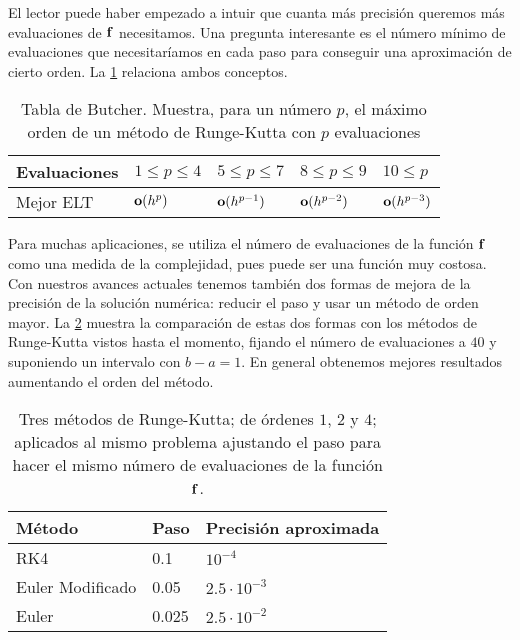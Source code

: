El lector puede haber empezado a intuir que cuanta más precisión queremos
más evaluaciones de $\vb{f}$ necesitamos.
Una pregunta interesante es
el número mínimo de evaluaciones que necesitaríamos en cada paso
para conseguir una aproximación de cierto orden.
La \cref{tab:butcher} relaciona ambos conceptos.

\begin{table}[H]
    \centering
    \begin{tabular}{|l||l|l|l|l|}
        \hline
        Evaluaciones & $1\le p\le 4$ & $5\le p\le 7$ & $8\le p\le 9$
            & $10\le p$ \\
        \hline
        Mejor ELT & $\vb{o}(h^p)$ & $\vb{o}(h^{p-1})$ & $\vb{o}(h^{p-2})$
            & $\vb{o}(h^{p-3})$ \\
        \hline
    \end{tabular}
    \caption{Tabla de Butcher.
        Muestra, para un número $p$,
        el máximo orden de un método de Runge-Kutta con $p$ evaluaciones}
    \label{tab:butcher}
\end{table}

Para muchas aplicaciones,
se utiliza el número de evaluaciones de la función $\vb{f}$
como una medida de la complejidad,
pues puede ser una función muy costosa.
Con nuestros avances actuales tenemos también dos formas de mejora
de la precisión de la solución numérica:
reducir el paso
y usar un método de orden mayor.
La \cref{tab:order-vs-step} muestra la comparación de estas dos formas
con los métodos de Runge-Kutta vistos hasta el momento,
fijando el número de evaluaciones a $40$
y suponiendo un intervalo con $b - a = 1$.
En general obtenemos mejores resultados aumentando el orden del método.

\begin{table}[H]
    \centering
    \begin{tabular}{|l|l|l|}
        \hline
    Método           & Paso  & Precisión aproximada \\
        \hline
        \hline
    RK4              & 0.1   & $10^{-4}$ \\
        \hline
    Euler Modificado & 0.05  & $2.5\cdot 10^{-3}$ \\
        \hline
    Euler            & 0.025 & $2.5\cdot 10^{-2}$ \\
        \hline
    \end{tabular}
    \caption{Tres métodos de Runge-Kutta;
        de órdenes $1$, $2$ y $4$;
        aplicados al mismo problema ajustando el paso
        para hacer el mismo número de evaluaciones de la función $\vb{f}$.
    }
    \label{tab:order-vs-step}
\end{table}

